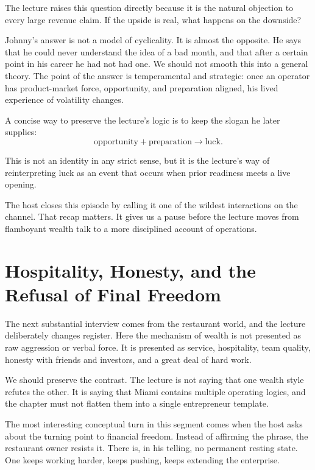 The lecture raises this question directly because it is the natural objection to every large revenue claim. If the upside is real, what happens on the downside?

Johnny's answer is not a model of cyclicality. It is almost the opposite. He says that he could never understand the idea of a bad month, and that after a certain point in his career he had not had one. We should not smooth this into a general theory. The point of the answer is temperamental and strategic: once an operator has product-market force, opportunity, and preparation aligned, his lived experience of volatility changes.

A concise way to preserve the lecture's logic is to keep the slogan he later supplies:
\begin{equation}
\text{opportunity} + \text{preparation} \longrightarrow \text{luck}.
\end{equation}

This is not an identity in any strict sense, but it is the lecture's way of reinterpreting luck as an event that occurs when prior readiness meets a live opening.

The host closes this episode by calling it one of the wildest interactions on the channel. That recap matters. It gives us a pause before the lecture moves from flamboyant wealth talk to a more disciplined account of operations.

\section{Hospitality, Honesty, and the Refusal of Final Freedom}

The next substantial interview comes from the restaurant world, and the lecture deliberately changes register. Here the mechanism of wealth is not presented as raw aggression or verbal force. It is presented as service, hospitality, team quality, honesty with friends and investors, and a great deal of hard work.

We should preserve the contrast. The lecture is not saying that one wealth style refutes the other. It is saying that Miami contains multiple operating logics, and the chapter must not flatten them into a single entrepreneur template.

The most interesting conceptual turn in this segment comes when the host asks about the turning point to financial freedom. Instead of affirming the phrase, the restaurant owner resists it. There is, in his telling, no permanent resting state. One keeps working harder, keeps pushing, keeps extending the enterprise.

